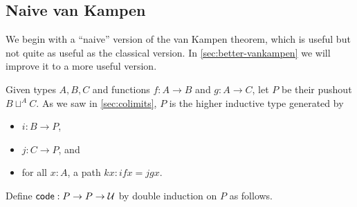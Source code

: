 \subsection{Naive van Kampen}
\label{sec:naive-vankampen}

We begin with a ``naive'' version of the van Kampen theorem, which is useful but not quite as useful as the classical version.
In \autoref{sec:better-vankampen} we will improve it to a more useful version.

Given types $A,B,C$ and functions $f:A\to B$ and $g:A\to C$, let $P$ be their pushout $B\sqcup^A C$.
As we saw in \autoref{sec:colimits}, $P$ is the higher inductive type generated by
\begin{itemize}
\item $i:B\to P$,
\item $j:C\to P$, and
\item for all $x:A$, a path $k x:ifx = jgx$.
\end{itemize}
Define $\mathsf{code}:P\to P\to \mathcal{U}$ by double induction on $P$ as follows.
